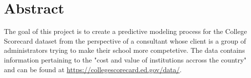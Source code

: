 \section{Abstract}

The goal of this project is to create a predictive modeling process for the College Scorecard dataset from the perspective of a consultant whose client is a group of administrators trying to make their school more competetive. The data contains information pertaining to the "cost and value of institutions accross the country" and can be found at \url{https://collegescorecard.ed.gov/data/}.


